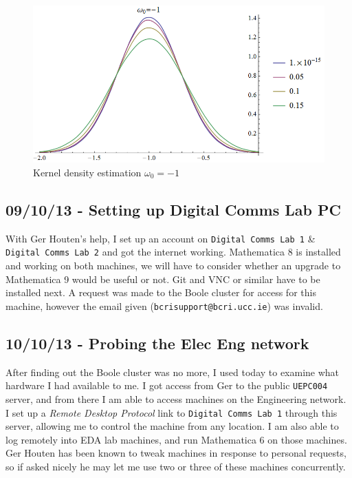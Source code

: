 \begin{figure}[htbp]
\centering
\includegraphics[width=\linewidth]{../../../plots/fyp1_w0_kde.png}
\caption{Kernel density estimation $\omega_0=-1$}
\end{figure}

\subsection{09/10/13 - Setting up Digital Comms Lab PC}

With Ger Houten's help, I set up an account on \texttt{Digital Comms Lab 1} \&
\texttt{Digital Comms Lab 2} and got the internet working. Mathematica 8
is installed and working on both machines, we will have to consider
whether an upgrade to Mathematica 9 would be useful or not. Git and VNC
or similar have to be installed next. A request was made to the Boole
cluster for access for this machine, however the email given
(\texttt{bcrisupport@bcri.ucc.ie}) was invalid.

\subsection{10/10/13 - Probing the Elec Eng network}

After finding out the Boole cluster was no more, I used today to examine
what hardware I had available to me. I got access from Ger to the public
\texttt{UEPC004} server, and from there I am able to access machines on
the Engineering network. I set up a \emph{Remote Desktop Protocol} link to
\texttt{Digital Comms Lab 1} through this server, allowing me to control
the machine from any location. I am also able to log remotely into EDA
lab machines, and run Mathematica 6 on those machines. Ger Houten has been known to tweak machines in response to
personal requests, so if asked nicely he may let me use two or three of
these machines concurrently.

